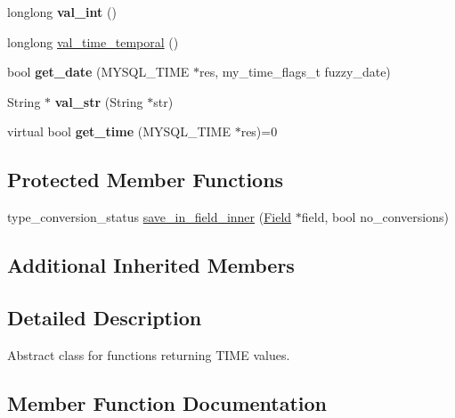 \begin{DoxyCompactItemize}
\item 
\mbox{\label{classItem__time__func_ae9934134d4bf106c50a4e9ec6eeee804}} 
longlong {\bfseries val\+\_\+int} ()
\item 
longlong \mbox{\hyperlink{classItem__time__func_ac6f281d250770126e010750dff54ef36}{val\+\_\+time\+\_\+temporal}} ()
\item 
\mbox{\label{classItem__time__func_ad5fce54341c1ad62d83a6998e79368ac}} 
bool {\bfseries get\+\_\+date} (M\+Y\+S\+Q\+L\+\_\+\+T\+I\+ME $\ast$res, my\+\_\+time\+\_\+flags\+\_\+t fuzzy\+\_\+date)
\item 
\mbox{\label{classItem__time__func_acad1910f524ff5a1c9d45d9ec64af2fb}} 
String $\ast$ {\bfseries val\+\_\+str} (String $\ast$str)
\item 
\mbox{\label{classItem__time__func_a219c2b3f52c973c57af24605845c6268}} 
virtual bool {\bfseries get\+\_\+time} (M\+Y\+S\+Q\+L\+\_\+\+T\+I\+ME $\ast$res)=0
\end{DoxyCompactItemize}
\subsection*{Protected Member Functions}
\begin{DoxyCompactItemize}
\item 
type\+\_\+conversion\+\_\+status \mbox{\hyperlink{classItem__time__func_aa97edadb152e620b50128499fc883a22}{save\+\_\+in\+\_\+field\+\_\+inner}} (\mbox{\hyperlink{classField}{Field}} $\ast$field, bool no\+\_\+conversions)
\end{DoxyCompactItemize}
\subsection*{Additional Inherited Members}


\subsection{Detailed Description}
Abstract class for functions returning T\+I\+ME values. 

\subsection{Member Function Documentation}
\mbox{\label{classItem__time__func_aa97edadb152e620b50128499fc883a22}} 
